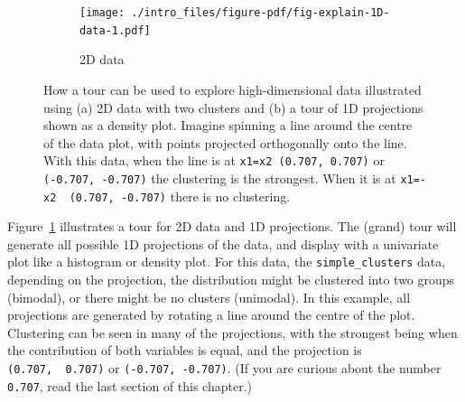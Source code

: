\documentclass[
  letterpaper,
]{book}
\begin{document}
\begin{figure}

\begin{minipage}[t]{0.40\linewidth}

{\centering 

\begin{figure}

{\centering \texttt{[image: ./intro\_files/figure-pdf/fig-explain-1D-data-1.pdf]}

}

\caption{2D data}

\end{figure}

}

\end{minipage}%
%
\begin{minipage}[t]{0.60\linewidth}

{\centering 

}

\end{minipage}%

\caption{\label{fig-explain-1D}How a tour can be used to explore
high-dimensional data illustrated using (a) 2D data with two clusters
and (b) a tour of 1D projections shown as a density plot. Imagine
spinning a line around the centre of the data plot, with points
projected orthogonally onto the line. With this data, when the line is
at \texttt{x1=x2\ (0.707,\ 0.707)} or \texttt{(-0.707,\ -0.707)} the
clustering is the strongest. When it is at
\texttt{x1=-x2\ \ (0.707,\ -0.707)} there is no clustering.}

\end{figure}

Figure~\ref{fig-explain-1D} illustrates a tour for 2D data and 1D
projections. The (grand) tour will generate all possible 1D projections
of the data, and display with a univariate plot like a histogram or
density plot. For this data, the \texttt{simple\_clusters} data,
depending on the projection, the distribution might be clustered into
two groups (bimodal), or there might be no clusters (unimodal). In this
example, all projections are generated by rotating a line around the
centre of the plot. Clustering can be seen in many of the projections,
with the strongest being when the contribution of both variables is
equal, and the projection is \texttt{(0.707,\ \ 0.707)} or
\texttt{(-0.707,\ -0.707)}. (If you are curious about the number
\texttt{0.707}, read the last section of this chapter.)
\end{document}
